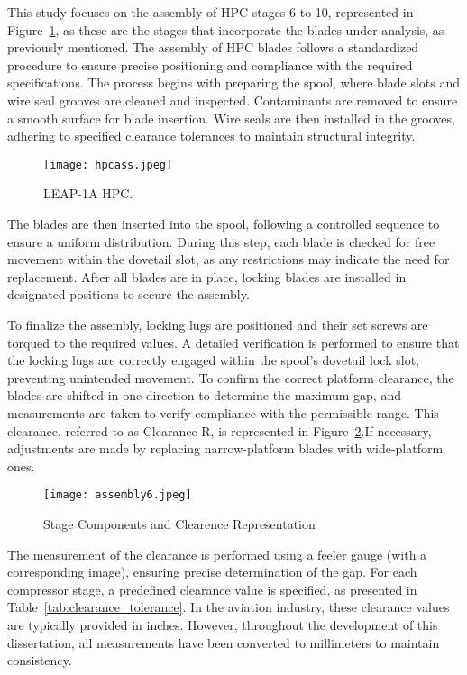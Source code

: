 This study focuses on the assembly of HPC stages 6 to 10, represented in Figure~\ref{fig:hpcass},  as these are the stages that incorporate the blades under analysis, as previously mentioned. The assembly of \gls{HPC} blades follows a standardized procedure to ensure precise positioning and compliance with the required specifications. The process begins with preparing the spool, where blade slots and wire seal grooves are cleaned and inspected. Contaminants are removed to ensure a smooth surface for blade insertion. Wire seals are then installed in the grooves, adhering to specified clearance tolerances to maintain structural integrity.

\begin{figure}[H]
    \centering
    \texttt{[image: hpcass.jpeg]}
    \caption{\gls{LEAP}-1A \gls{HPC}.}
    \label{fig:hpcass}
\end{figure}


The blades are then inserted into the spool, following a controlled sequence to ensure a uniform distribution. During this step, each blade is checked for free movement within the dovetail slot, as any restrictions may indicate the need for replacement. After all blades are in place, locking blades are installed in designated positions to secure the assembly.

To finalize the assembly, locking lugs are positioned and their set screws are torqued to the required values. A detailed verification is performed to ensure that the locking lugs are correctly engaged within the spool’s dovetail lock slot, preventing unintended movement. To confirm the correct platform clearance, the blades are shifted in one direction to determine the maximum gap, and measurements are taken to verify compliance with the permissible range. This clearance, referred to as Clearance R, is represented in Figure~\ref{fig:assembly6}.If necessary, adjustments are made by replacing narrow-platform blades with wide-platform ones.

\begin{figure}[H]
    \centering
    \texttt{[image: assembly6.jpeg]}
    \caption{Stage Components and Clearence Representation}
    \label{fig:assembly6}
\end{figure}


The measurement of the clearance is performed using a feeler gauge (with a corresponding image), ensuring precise determination of the gap. For each compressor stage, a predefined clearance value is specified, as presented in Table~\ref{tab:clearance_tolerance}. In the aviation industry, these clearance values are typically provided in inches. However, throughout the development of this dissertation, all measurements have been converted to millimeters to maintain consistency.

